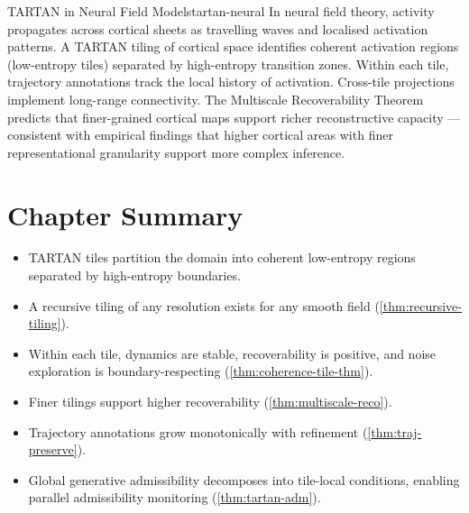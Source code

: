 \documentclass[12pt,twoside,openright]{book}
\newcommand{\bioicon}{\marginpar{\tiny\color{DistTeal}\faDna}}
\newenvironment{chapsummary}{%
  \begin{tcolorbox}[colback=DistBlue!5,colframe=DistBlue,
    title={\faBookOpen\enspace Summary},
    fonttitle=\sffamily\bfseries\color{white},
    attach boxed title to top left={yshift=-2mm,xshift=4mm},
    boxed title style={colback=DistBlue,rounded corners}]
  \begin{itemize}[nosep,leftmargin=*]}{%
  \end{itemize}\end{tcolorbox}}
\begin{document}
\begin{example}{TARTAN in Neural Field Models}{tartan-neural}
  \bioicon
  In neural field theory, activity propagates across
  cortical sheets as travelling waves and localised
  activation patterns. A TARTAN tiling of cortical space
  identifies coherent activation regions (low-entropy
  tiles) separated by high-entropy transition zones.
  Within each tile, trajectory annotations track the
  local history of activation. Cross-tile projections
  implement long-range connectivity. The Multiscale
  Recoverability Theorem predicts that finer-grained
  cortical maps support richer reconstructive capacity
  — consistent with empirical findings that higher
  cortical areas with finer representational granularity
  support more complex inference.
\end{example}

\section*{Chapter Summary}
\begin{chapsummary}
  \item TARTAN tiles partition the domain into coherent
        low-entropy regions separated by high-entropy
        boundaries.
  \item A recursive tiling of any resolution exists for
        any smooth field (\cref{thm:recursive-tiling}).
  \item Within each tile, dynamics are stable,
        recoverability is positive, and noise exploration
        is boundary-respecting
        (\cref{thm:coherence-tile-thm}).
  \item Finer tilings support higher recoverability
        (\cref{thm:multiscale-reco}).
  \item Trajectory annotations grow monotonically with
        refinement (\cref{thm:traj-preserve}).
  \item Global generative admissibility decomposes into
        tile-local conditions, enabling parallel
        admissibility monitoring
        (\cref{thm:tartan-adm}).
\end{chapsummary}
\end{document}
